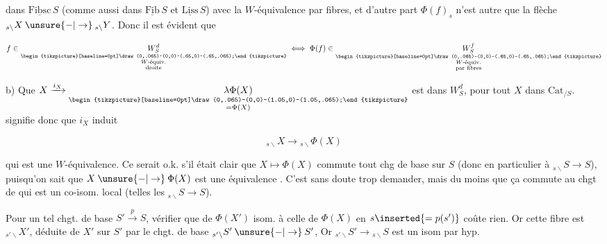 
dans $\underline{\mathrm{Fibsc}}\,S$ (comme aussi dans $\underline{\mathrm{Fib}}\,S$ et $\underline{\mathrm{Liss}}\,S$) avec la $W$-équivalence par fibres, et d'autre part $\Phi(f)_s$ n'est autre que la flèche  $ {}_{s\backslash}X\mathbin{\unsure{-|\to}}{}_{s\backslash}Y$. Donc il est évident que 

\[
 f\in\underset{\substack{\begin{tikzpicture}[baseline=0pt]\draw (0,.065)--(0,0)--(.65,0)--(.65,.065);\end{tikzpicture}\\W\text{-équiv.}\\ \text{droite}}}{W_S^d}\iff
 \Phi(f)\in\underset{\substack{\begin{tikzpicture}[baseline=0pt]\draw (0,.065)--(0,0)--(.65,0)--(.65,.065);\end{tikzpicture}\\W\text{-équiv.}\\ \text{par fibres}}}{W_S^f}
\]

b) Que $X\xrightarrow{i_X}\underset{\substack{\begin{tikzpicture}[baseline=0pt]\draw (0,.065)--(0,0)--(1.05,0)--(1.05,.065);\end{tikzpicture}\\=\Phi(X)}}{\lambda\Phi(X)}$ est dans $W_S^d$, pour tout $X$ dans $\mathrm{Cat}_{/S}$.  signifie donc que $i_X$ induit

\[
 {}_{s\backslash}X\longrightarrow{}_{s\backslash}\Phi(X)
\]

qui est une $W$-équivalence. Ce serait o.k. s'il était clair que $X\longmapsto\Phi(X)$ commute  tout chg de base  sur $S$ (donc en particulier à $ {}_{s\backslash}S\longrightarrow S$), puisqu'on sait que $X\mathbin{\unsure{-|\to}}\Phi(X)$ est une équivalence . C'est sans doute trop demander, mais du moins que ça commute au chgt de  qui est un co-isom. local (telles les $ {}_{s\backslash}S\longrightarrow S$).

 Pour un tel chgt. de base $S'\xrightarrow{p}S$, vérifier que    de $\Phi(X')$     isom. à celle de $\Phi(X)$ en $s\inserted{=p(s')}$  coûte rien. Or cette fibre est $ {}_{s'\backslash}X'$, déduite de $X'$ sur $S'$  par le chgt. de base $ {}_{s'\backslash}S'\mathbin{\unsure{-|\to}} S'$,  Or $ {}_{s'\backslash}S'\longrightarrow{}_{s\backslash}S$ est un isom par hyp.

